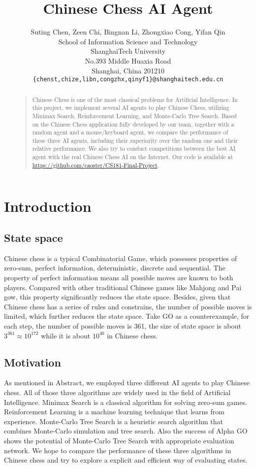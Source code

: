 \documentclass[letterpaper]{article}
\title{Chinese Chess AI Agent}
\author{Suting Chen, Zeen Chi, Bingnan Li, Zhongxiao Cong, Yifan Qin\\
School of Information Science and Technology\\
ShanghaiTech University\\
No.393 Middle Huaxia Road\\
Shanghai, China 201210\\
\texttt{\{chenst,chize,libn,congzhx,qinyf1\}@shanghaitech.edu.cn}
}
\begin{document}
\maketitle

\begin{abstract}
\begin{quote}
Chinese Chess is one of the most classical problems for Artificial Intelligence.
In this project, we implement several AI agents to play Chinese Chess, utilizing Minimax Search, Reinforcement Learning, and Monte-Carlo Tree Search.
Based on the Chinese Chess application fully developed by our team, together with a random agent and a mouse/keyboard agent, we compare the performance of these three AI agents, including their superiority over the random one and their relative performance.
We also try to conduct competitions between the best AI agent with the real Chinese Chess AI on the Internet.
Our code is available at \url{https://github.com/caoster/CS181-Final-Project}.
\end{quote}
\end{abstract}


    \section{Introduction}\label{sec:introduction}

    \subsection{State space}\label{subsec:state-space}
    Chinese chess is a typical Combinatorial Game, which possesses properties of zero-sum, perfect information, deterministic, discrete and sequential.
    The property of perfect information means all possible moves are known to both players.
    Compared with other traditional Chinese games like Mahjong and Pai gow, this property significantly reduces the state space.
    Besides, given that Chinese chess has a series of rules and constrains, the number of possible moves is limited, which further reduces the state space.
    Take GO as a counterexample, for each step, the number of possible moves is 361, the size of state space is about $3^{361}\approx 10^{172}$ while it is about $10^{40}$ in Chinese chess.

    \subsection{Motivation}\label{subsec:motivation}
    As mentioned in Abstract, we employed three different AI agents to play Chinese chess.
    All of those three algorithms are widely used in the field of Artificial Intelligence.
    Minimax Search is a classical algorithm for solving zero-sum games.
    Reinforcement Learning is a machine learning technique that learns from experience.
    Monte-Carlo Tree Search is a heuristic search algorithm that combines Monte-Carlo simulation and tree search.
    Also the success of Alpha GO shows the potential of Monte-Carlo Tree Search with appropriate evaluation network.
    We hope to compare the performance of these three algorithms in Chinese chess and try to explore a explicit and efficient way of evaluating states.
\end{document}
